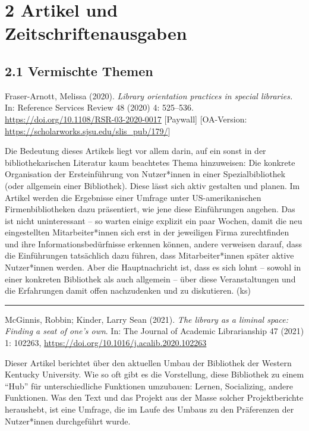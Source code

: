 \documentclass[a4paper,
fontsize=11pt,
oneside,
numbers=noperiodatend,
parskip=half-,
bibliography=totoc,
final
]{scrartcl}
\begin{document}
\hypertarget{artikel-und-zeitschriftenausgaben}{%
\section{2 Artikel und
Zeitschriftenausgaben}\label{artikel-und-zeitschriftenausgaben}}

\hypertarget{vermischte-themen}{%
\subsection{2.1 Vermischte Themen}\label{vermischte-themen}}

Fraser-Arnott, Melissa (2020). \emph{Library orientation practices in
special libraries.} In: Reference Services Review 48 (2020) 4: 525--536.
\url{https://doi.org/10.1108/RSR-03-2020-0017} {[}Paywall{]}
{[}OA-Version: \url{https://scholarworks.sjsu.edu/slis_pub/179/}{]}

Die Bedeutung dieses Artikels liegt vor allem darin, auf ein sonst in
der bibliothekarischen Literatur kaum beachtetes Thema hinzuweisen: Die
konkrete Organisation der Ersteinführung von Nutzer*innen in einer
Spezialbibliothek (oder allgemein einer Bibliothek). Diese lässt sich
aktiv gestalten und planen. Im Artikel werden die Ergebnisse einer
Umfrage unter US-amerikanischen Firmenbibliotheken dazu präsentiert, wie
jene diese Einführungen angehen. Das ist nicht uninteressant -- so
warten einige explizit ein paar Wochen, damit die neu eingestellten
Mitarbeiter*innen sich erst in der jeweiligen Firma zurechtfinden und
ihre Informationsbedürfnisse erkennen können, andere verweisen darauf,
dass die Einführungen tatsächlich dazu führen, dass Mitarbeiter*innen
später aktive Nutzer*innen werden. Aber die Hauptnachricht ist, dass es
sich lohnt -- sowohl in einer konkreten Bibliothek als auch allgemein --
über diese Veranstaltungen und die Erfahrungen damit offen nachzudenken
und zu diskutieren. (ks)

\begin{center}\rule{0.5\linewidth}{0.5pt}\end{center}

McGinnis, Robbin; Kinder, Larry Sean (2021). \emph{The library as a
liminal space: Finding a seat of one's own}. In: The Journal of Academic
Librarianship 47 (2021) 1: 102263,
\url{https://doi.org/10.1016/j.acalib.2020.102263}

Dieser Artikel berichtet über den aktuellen Umbau der Bibliothek der
Western Kentucky University. Wie so oft gibt es die Vorstellung, diese
Bibliothek zu einem \enquote{Hub} für unterschiedliche Funktionen
umzubauen: Lernen, Socializing, andere Funktionen. Was den Text und das
Projekt aus der Masse solcher Projektberichte heraushebt, ist eine
Umfrage, die im Laufe des Umbaus zu den Präferenzen der Nutzer*innen
durchgeführt wurde.
\end{document}
